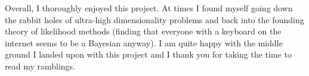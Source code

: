Overall, I thoroughly enjoyed this project. At times I found myself going down the rabbit holes of ultra-high dimensionality problems and back into the founding theory of likelihood methods (finding that everyone with a keyboard on the internet seems to be a Bayesian anyway). I am quite happy with the middle ground I landed upon with this project and I thank you for taking the time to read my ramblings.
